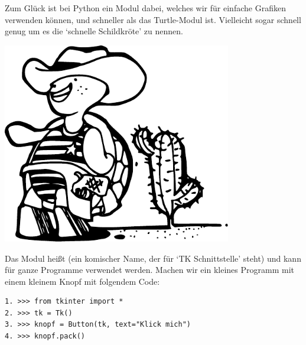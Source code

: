 Zum Glück ist bei Python ein Modul dabei, welches wir für einfache Grafiken verwenden können, und schneller als das Turtle-Modul ist. Vielleicht sogar schnell genug um es die `schnelle Schildkröte' zu nennen.

\begin{center}
\includegraphics*[width=100mm]{images/turtle2}
\end{center}

Das Modul heißt  (ein komischer Name, der für `TK Schnittstelle' steht) und kann für ganze Programme verwendet werden. Machen wir ein kleines Programm mit einem kleinem Knopf mit folgendem Code:

\begin{Verbatim}[frame=single]
1. >>> from tkinter import *
2. >>> tk = Tk()
3. >>> knopf = Button(tk, text="Klick mich")
4. >>> knopf.pack()
\end{Verbatim}

